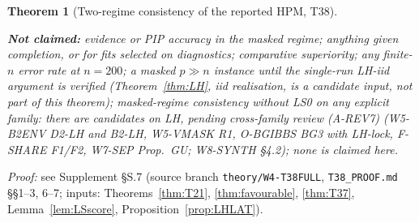 \documentclass[11pt]{article}
\newtheorem{theorem}{Theorem}
\theoremstyle{definition}
\theoremstyle{remark}
\begin{document}
\begin{theorem}[Two-regime consistency of the reported HPM, T38]
\begin{enumerate}
\end{enumerate}
\textbf{Not claimed:} evidence or PIP accuracy in the masked regime; anything given completion, or for fits selected on diagnostics; comparative superiority; any finite-$n$ error rate at $n=200$; a masked $p\gg n$ instance until the single-run LH-iid argument is verified (Theorem~\ref{thm:LH}, iid realisation, is a \emph{candidate input}, not part of this theorem); masked-regime consistency \emph{without} LS0 on any explicit family: there are candidates on LH, pending cross-family review (A-REV7) (W5-B2ENV D2-LH and B2-LH, W5-VMASK R1, O-BGIBBS BG3 with LH-lock, F-SHARE F1/F2, W7-SEP Prop.~GU; W8-SYNTH \S4.2); none is claimed here.
\end{theorem}
\noindent\emph{Proof:} see Supplement \S S.7 (source branch \texttt{theory/W4-T38FULL}, \texttt{T38\_PROOF.md} \S\S1--3, 6--7; inputs: Theorems~\ref{thm:T21}, \ref{thm:favourable}, \ref{thm:T37}, Lemma~\ref{lem:LSscore}, Proposition~\ref{prop:LHLAT}).
\end{document}
